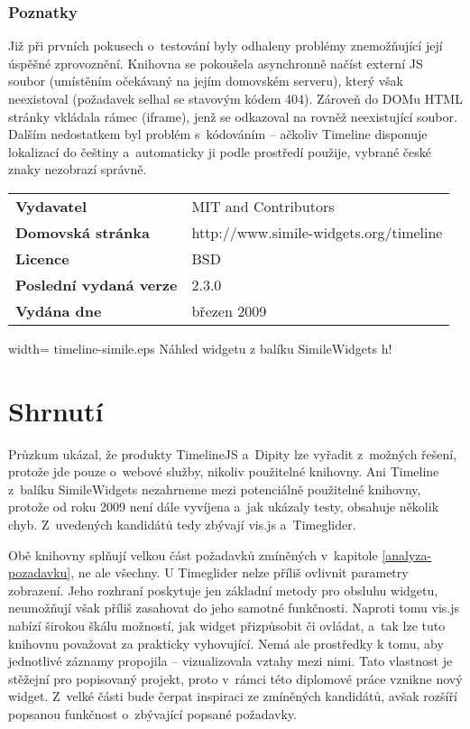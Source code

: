 		\subsubsection*{Poznatky} 
		Již při prvních pokusech o~testování byly odhaleny problémy znemožňující její úspěšné zprovoznění. Knihovna se pokoušela asynchronně načíst externí JS soubor (umís\-těním očekávaný na jejím domovském serveru), který však neexistoval (požadavek selhal se stavovým kódem 404). Zároveň do DOMu HTML stránky vkládala rámec (iframe), jenž se odkazoval na rovněž neexistující soubor. Dalším nedostatkem byl problém s~kódováním – ačkoliv {\sf Timeline} disponuje lokalizací do češtiny a~automaticky ji podle prostředí použije, vybrané české znaky nezobrazí správně.
	
		\vspace{\baselineskip}
		\renewcommand{\arraystretch}{1.3}
		\noindent
		\begin{tabularx}{\textwidth}{|lX|}
		\hline
		\bf Vydavatel &  MIT and Contributors \\
		\bf Domovská stránka & http://www.simile-widgets.org/timeline \\
		\bf Licence & BSD \\
		\bf Poslední vydaná verze & 2.3.0 \\
		\bf Vydána dne & březen 2009 \\
		\hline
		\end{tabularx}
		
		  {width=\textwidth}
		  {timeline-simile.eps}
		  {Náhled widgetu z balíku {\sf SimileWidgets}}
		  {h!}
		
	\section{Shrnutí}
	Průzkum ukázal, že produkty {\sf TimelineJS} a~{\sf Dipity} lze vyřadit z~možných řešení, protože jde pouze o~webové služby, nikoliv použitelné knihovny.
	Ani {\sf Timeline} z~balíku {\sf SimileWidgets} nezahrneme mezi potenciálně použitelné knihovny, protože od roku 2009 není dále vyvíjena a~jak ukázaly testy, obsahuje několik chyb. Z~uvedených kandidátů tedy zbývají {\sf vis.js} a~{\sf Timeglider}.
	
	Obě knihovny splňují velkou část požadavků zmíněných v~kapitole \ref{analyza-pozadavku}, ne ale všechny. U {\sf Timeglider} nelze příliš ovlivnit parametry zobrazení. Jeho rozhraní poskytuje jen základní metody pro obsluhu widgetu, neumožňují však příliš zasahovat do jeho samotné funkčnosti. Naproti tomu {\sf vis.js} nabízí širokou škálu možností, jak widget přizpůsobit či ovládat, a~tak lze tuto knihovnu považovat za prakticky vyhovující. Nemá ale prostředky k tomu, aby jednotlivé záznamy propojila -- vizualizovala vztahy mezi nimi. Tato vlastnost je stěžejní pro popisovaný projekt, proto v~rámci této diplomové práce vznikne nový widget. Z~velké části bude čerpat inspiraci ze zmíněných kandidátů, avšak rozšíří popsanou funkčnost o~zbývající popsané požadavky.
			
			